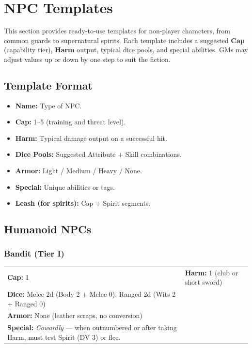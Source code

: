 
\section{NPC Templates}

This section provides ready-to-use templates for non-player characters, from common guards to supernatural spirits. Each template includes a suggested \textbf{Cap} (capability tier), \textbf{Harm} output, typical dice pools, and special abilities. GMs may adjust values up or down by one step to suit the fiction.

\subsection{Template Format}

\begin{itemize}
  \item \textbf{Name:} Type of NPC.
  \item \textbf{Cap:} 1--5 (training and threat level).
  \item \textbf{Harm:} Typical damage output on a successful hit.
  \item \textbf{Dice Pools:} Suggested Attribute + Skill combinations.
  \item \textbf{Armor:} Light / Medium / Heavy / None.
  \item \textbf{Special:} Unique abilities or tags.
  \item \textbf{Leash (for spirits):} Cap + Spirit segments.
\end{itemize}

\subsection{Humanoid NPCs}

\subsubsection{Bandit (Tier I)}
\vspace{0.2em}
\begin{tabular}{@{}ll@{}}
\textbf{Cap:} 1 & \textbf{Harm:} 1 (club or short sword) \\
\textbf{Dice:} Melee 2d (Body 2 + Melee 0), Ranged 2d (Wits 2 + Ranged 0) \\
\textbf{Armor:} None (leather scraps, no conversion) \\
\textbf{Special:} \textit{Cowardly} --- when outnumbered or after taking Harm, must test Spirit (DV 3) or flee.
\end{tabular}

